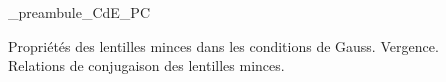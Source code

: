 



\ifdefined\mainIsLoaded\else
\RequirePackage{import}
{_preambule_CdE_PC}

\fi








\debutFicheEntrainement                                                                      %




\begin{prerequis}
Propriétés des lentilles minces dans les conditions de Gauss. Vergence. \\
Relations de conjugaison des lentilles minces. 
\end{prerequis}






